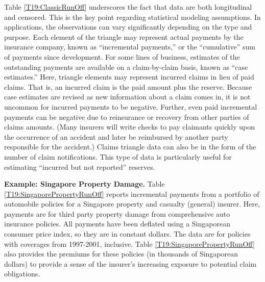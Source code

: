 
Table \ref{T19:ClassicRunOff} underscores the fact that data are
both longitudinal and censored. This is the key point regarding
statistical modeling assumptions. In applications, the observations
can vary significantly depending on the type and purpose. Each
element of the triangle may represent actual payments by the
insurance company, known as ``incremental payments,'' or the
``cumulative'' sum of payments since development. For some lines of
business, estimates of the outstanding payments are available on a
claim-by-claim basis, known as ``case estimates.'' Here, triangle
elements may represent incurred claims in lieu of paid claims. That
is, an incurred claim is the paid amount plus the reserve. Because
case estimates are revised as new information about a claim comes
in, it is not uncommon for incurred payments to be negative.
Further, even paid incremental payments can be negative due to
reinsurance or recovery from other parties of claims amounts. (Many
insurers will write checks to pay claimants quickly upon the
occurrence of an accident and later be reimbursed by another party
responsible for the accident.) Claims triangle data can also be in
the form of the number of claim notifications. This type of data is
particularly useful for estimating ``incurred but not reported''
reserves.

\linejed{}

\textbf{Example: Singapore Property Damage.} Table \ref{T19:SingaporePropertyRunOff} reports
incremental payments from a portfolio of automobile policies for a
Singapore property and casualty (general) insurer. Here, payments
are for third party property damage from comprehensive auto
insurance policies. All payments have been deflated using a
Singaporean consumer price index, so they are in constant dollars.
The data are for policies with coverages from 1997-2001, inclusive.
Table \ref{T19:SingaporePropertyRunOff} also provides the premiums
for these policies (in thousands of Singaporean dollars) to provide
a sense of the insurer's increasing exposure to potential claim
obligations.



